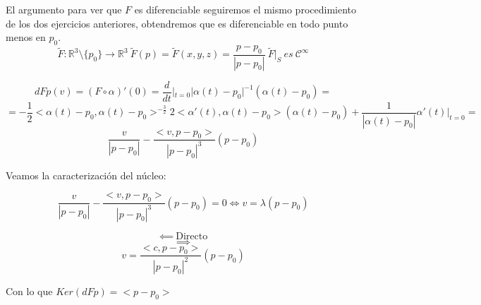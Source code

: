 \documentclass[openany]{book}
\begin{document}
\begin{exercise}
    El argumento para ver que $ F $ es diferenciable seguiremos el mismo procedimiento de los dos ejercicios anteriores, obtendremos que es diferenciable en todo punto menos en $ p_0 $.
    $$ \widetilde{F}: \mathbb{R}^3 \setminus \{p_0\} \to \mathbb{R}^3 \ \widetilde{F}(p) = \widetilde{F}(x,y,z) = \dfrac{p-p_0}{|p-p_0|}\ \widetilde{F}|_{S}\ es\ \mathcal{C}^{\infty}$$

    $$ dFp(v) = (F \circ \alpha)' (0) = \dfrac{d}{dt}|_{t=0} |\alpha(t) - p_0 | ^{-1} (\alpha (t)-p_0) =$$$$= -\dfrac{1}{2}<\alpha(t)-p_0,\alpha(t)-p_0> ^{-\frac{3}{2}} 2<\alpha'(t),\alpha(t)-p_0>(\alpha(t)-p_0) + \dfrac{1}{|\alpha(t)-p_0|}\alpha'(t)|_{t=0} = $$
    $$ \dfrac{v}{|p-p_0|}- \dfrac{<v,p-p_0>}{|p-p_0|^3}(p-p_0)  $$

    Veamos la caracterización del núcleo:

    $$ \dfrac{v}{|p-p_0|}- \dfrac{<v,p-p_0>}{|p-p_0|^3}(p-p_0) = 0 \iff v = \lambda(p-p_0)  $$

    $$ \impliedby\ \text{Directo} $$
    $$ \implies  $$
    $$ v = \dfrac{<c,p-p_0>}{|p-p_0|^2}(p-p_0) $$

    Con lo que $ Ker(dFp) = <p-p_0> $
    


\end{exercise}
\end{document}
